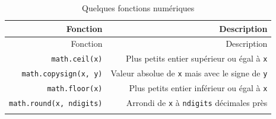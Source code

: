 \documentclass[12pt,]{book}
\numberwithin{equation}{section}
\numberwithin{countremarque}{section}
\begin{document}
\begin{longtable}[]{@{}rr@{}}
\caption{\label{tab:fonctions-numeriques} Quelques fonctions
numériques}\tabularnewline
\toprule
\begin{minipage}[b]{0.21\columnwidth}\raggedleft\strut
Fonction\strut
\end{minipage} & \begin{minipage}[b]{0.60\columnwidth}\raggedleft\strut
Description\strut
\end{minipage}\tabularnewline
\midrule
\endfirsthead
\toprule
\begin{minipage}[b]{0.21\columnwidth}\raggedleft\strut
Fonction\strut
\end{minipage} & \begin{minipage}[b]{0.60\columnwidth}\raggedleft\strut
Description\strut
\end{minipage}\tabularnewline
\midrule
\endhead
\begin{minipage}[t]{0.21\columnwidth}\raggedleft\strut
\texttt{math.ceil(x)}\strut
\end{minipage} & \begin{minipage}[t]{0.60\columnwidth}\raggedleft\strut
Plus petits entier supérieur ou égal à \texttt{x}\strut
\end{minipage}\tabularnewline
\begin{minipage}[t]{0.21\columnwidth}\raggedleft\strut
\texttt{math.copysign(x,\ y)}\strut
\end{minipage} & \begin{minipage}[t]{0.60\columnwidth}\raggedleft\strut
Valeur absolue de \texttt{x} mais avec le signe de \texttt{y}\strut
\end{minipage}\tabularnewline
\begin{minipage}[t]{0.21\columnwidth}\raggedleft\strut
\texttt{math.floor(x)}\strut
\end{minipage} & \begin{minipage}[t]{0.60\columnwidth}\raggedleft\strut
Plus petits entier inférieur ou égal à \texttt{x}\strut
\end{minipage}\tabularnewline
\begin{minipage}[t]{0.21\columnwidth}\raggedleft\strut
\texttt{math.round(x,\ ndigits)}\strut
\end{minipage} & \begin{minipage}[t]{0.60\columnwidth}\raggedleft\strut
Arrondi de \texttt{x} à \texttt{ndigits} décimales près\strut
\end{minipage}\tabularnewline
\begin{minipage}[t]{0.21\columnwidth}\raggedleft\strut

\end{minipage}
\end{longtable}
\end{document}
